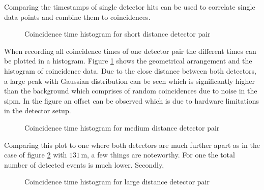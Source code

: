 \documentclass[abstract,toc,los,lof,english,10pt,glossary,acronyms]{jluthesis}
\begin{document}
Comparing the timestamps of single detector hits can be used to correlate single data points and combine them to coincidences.
\begin{figure}[H]
	\centering
	\caption{Coincidence time histogram for short distance detector pair}
	\label{fig:histogram-data}
\end{figure}
When recording all coincidence times of one detector pair the different times can be plotted in a histogram. Figure \ref{fig:histogram-data} shows the geometrical arrangement and the histogram of coincidence data. Due to the close distance between both detectors, a large peak with Gaussian distribution can be seen which is significantly higher than the background which comprises of random coincidences due to noise in the \acrshort{sipm}. In the figure an offset can be observed which is due to hardware limitations in the detector setup.
\begin{figure}[H]
	\centering
	\caption{Coincidence time histogram for medium distance detector pair}
	\label{fig:histogram-data-130}
\end{figure}
Comparing this plot to one where both detectors are much further apart as in the case of figure \ref{fig:histogram-data-130} with $131\,\text{m}$, a few things are noteworthy.
For one the total number of detected events is much lower. 
Secondly, 
\begin{figure}[H]
	\centering
	\caption{Coincidence time histogram for large distance detector pair}
	\label{fig:histogram-data-950k}
\end{figure}
\end{document}

